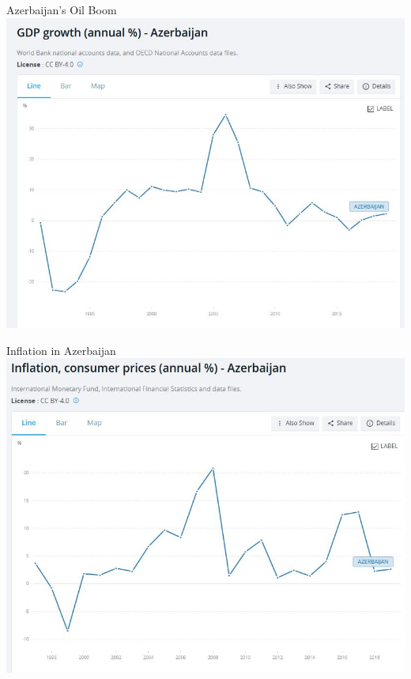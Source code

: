 \documentclass[handout]{beamer}
\begin{document}
\begin{frame}{\LARGE Azerbaijan's Oil Boom}
	\centering
	\includegraphics[width=\textwidth,height=0.8\textheight,keepaspectratio]{azerbaijan growth.JPG}
\end{frame}

\begin{frame}{\LARGE Inflation in Azerbaijan}
	\centering
	\includegraphics[width=\textwidth,height=0.8\textheight,keepaspectratio]{azerbaijan inflation.JPG}
\end{frame}
\end{document}
